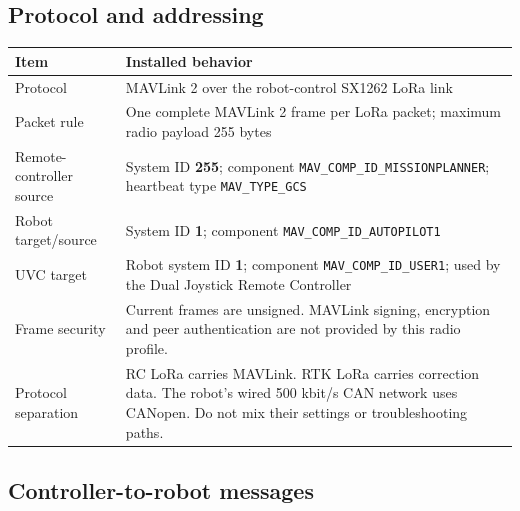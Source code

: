 \documentclass[
  10pt,
  letterpaper,
  openany]{report}
\newcounter{none} %
\begin{document}
\subsection{Protocol and addressing}\label{protocol-and-addressing}

{\def\LTcaptype{none} %
\begin{longtable}[]{@{}
  >{\raggedright\arraybackslash}p{}
  >{\raggedright\arraybackslash}p{}@{}}
\toprule\noalign{}
\begin{minipage}[b]{\linewidth}\raggedright
Item
\end{minipage} & \begin{minipage}[b]{\linewidth}\raggedright
Installed behavior
\end{minipage} \\
\midrule\noalign{}
\endhead
\bottomrule\noalign{}
\endlastfoot
Protocol & MAVLink 2 over the robot-control SX1262 LoRa link \\
Packet rule & One complete MAVLink 2 frame per LoRa packet; maximum
radio payload 255 bytes \\
Remote-controller source & System ID \textbf{255}; component
\texttt{MAV\_COMP\_ID\_MISSIONPLANNER}; heartbeat type
\texttt{MAV\_TYPE\_GCS} \\
Robot target/source & System ID \textbf{1}; component
\texttt{MAV\_COMP\_ID\_AUTOPILOT1} \\
UVC target & Robot system ID \textbf{1}; component
\texttt{MAV\_COMP\_ID\_USER1}; used by the Dual Joystick Remote
Controller \\
Frame security & Current frames are unsigned. MAVLink signing,
encryption and peer authentication are not provided by this radio
profile. \\
Protocol separation & RC LoRa carries MAVLink. RTK LoRa carries
correction data. The robot's wired 500 kbit/s CAN network uses CANopen.
Do not mix their settings or troubleshooting paths. \\
\end{longtable}
}

\subsection{Controller-to-robot
messages}\label{controller-to-robot-messages}
\end{document}
